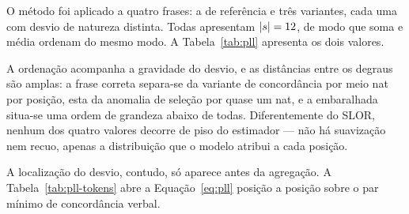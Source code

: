 O método foi aplicado a quatro frases: a de referência e três variantes, cada uma com desvio
de natureza distinta. Todas apresentam $|s| = 12$, de modo que soma e média ordenam do
mesmo modo. A Tabela~\ref{tab:pll} apresenta os dois valores.

\begin{table}[H]
\centering
{}
\caption{O PLL sobre a frase de referência e três variantes.}
\label{tab:pll}
\end{table}

A ordenação acompanha a gravidade do desvio, e as distâncias entre os degraus são amplas: a
frase correta separa-se da variante de concordância por meio nat por posição, esta da anomalia
de seleção por quase um nat, e a embaralhada situa-se uma ordem de grandeza abaixo de todas.
Diferentemente do SLOR, nenhum dos quatro valores decorre de piso do estimador --- não há
suavização nem recuo, apenas a distribuição que o modelo atribui a cada posição.

A localização do desvio, contudo, só aparece antes da agregação. A Tabela~\ref{tab:pll-tokens}
abre a Equação~\ref{eq:pll} posição a posição sobre o par mínimo de concordância verbal.

